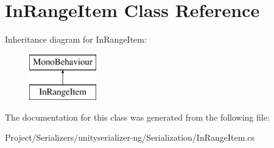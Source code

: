 \hypertarget{class_in_range_item}{}\section{In\+Range\+Item Class Reference}
\label{class_in_range_item}
Inheritance diagram for In\+Range\+Item\+:\begin{figure}[H]
\begin{center}
\leavevmode
\includegraphics[height=2.000000cm]{class_in_range_item}
\end{center}
\end{figure}


The documentation for this class was generated from the following file\+:\begin{DoxyCompactItemize}
\item 
Project/\+Serializers/unityserializer-\/ng/\+Serialization/In\+Range\+Item.\+cs\end{DoxyCompactItemize}
